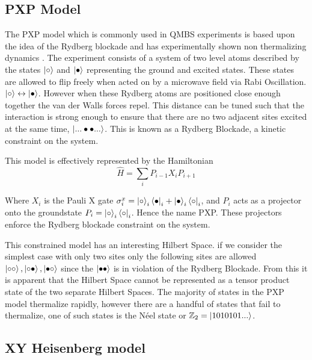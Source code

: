 \subsection{PXP Model}
The PXP model which is commonly used in QMBS experiments is based upon the idea of the Rydberg blockade and has experimentally shown non thermalizing dynamics \cite{bernien_probing_2017}.  The experiment consists of a system of two level atoms described by the states $\ket{\circ}$ and $\ket{\bullet}$ representing the ground and excited states. These states are allowed to flip freely when acted on by a microwave field via Rabi Oscillation. $\ket{\circ} \leftrightarrow \ket{\bullet}$. However when these Rydberg atoms are positioned close enough together the van der Walls forces repel. This distance can be tuned such that the interaction is strong enough to ensure that there are no two adjacent sites excited at the same time, $\ket{...\bullet \bullet ...}$. This is known as a Rydberg Blockade, a kinetic constraint on the system.

This model is effectively represented by the Hamiltonian 
\begin{equation}
\hat{H} = \sum_i P_{i-1}X_iP_{i+1}
\end{equation}

Where $X_i$ is the Pauli X gate $\sigma^x_i = \ket{\circ}_i\bra{\bullet}_i+\ket{\bullet}_i\bra{\circ}_i$, and $P_i$ acts as a projector onto the groundstate $P_i = \ket{\circ}_i\bra{\circ}_i$. Hence the name PXP. These projectors enforce the Rydberg blockade constraint on the system.  

This constrained model has an interesting Hilbert Space. if we consider the simplest case with only two sites only the following sites are allowed $\ket{\circ \circ},\ket{\circ \bullet},\ket{\bullet \circ}$ since the $\ket{\bullet \bullet}$ is in violation of the Rydberg Blockade. From this it is apparent that the Hilbert Space cannot be represented as a tensor product state of the two separate Hilbert Spaces.
The majority of states in the PXP model thermalize rapidly, however there are a handful of states that fail to thermalize, one of such states is the N\'eel state or $\mathbb{Z}_2 = \ket{1010101...}$. \cite{turner_quantum_2018-1, chen_dynamics_2022}

\subsection{XY Heisenberg model} \label{sec:xymodel}

